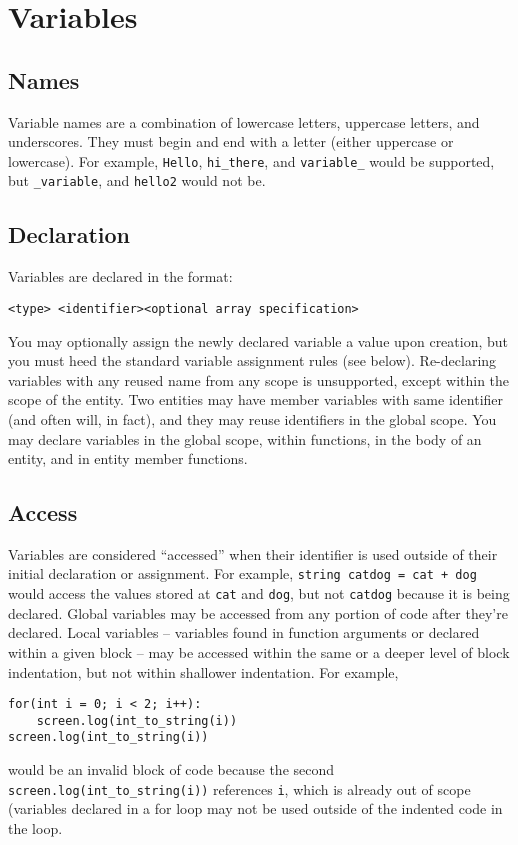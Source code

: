 \documentclass[titlepage]{article}
\begin{document}
\section{Variables}

\subsection{Names}
Variable names are a combination of lowercase letters, uppercase letters, and underscores. They must begin and end with a letter (either uppercase or lowercase). For example, \verb|Hello|, \verb|hi_there|, and \verb|variable_| would be supported, but \verb|_variable|, and \verb|hello2| would not be.

\subsection{Declaration}
Variables are declared in the format:
\begin{verbatim}
<type> <identifier><optional array specification>
\end{verbatim}
You may optionally assign the newly declared variable a value upon creation, but you must heed the standard variable assignment rules (see below). Re-declaring variables with any reused name from any scope is unsupported, except within the scope of the entity. Two entities may have member variables with same identifier (and often will, in fact), and they may reuse identifiers in the global scope.  You may declare variables in the global scope, within functions, in the body of an entity, and in entity member functions.

\subsection{Access}
Variables are considered “accessed” when their identifier is used outside of their initial declaration or assignment. For example, \verb|string catdog = cat + dog| would access the values stored at \verb|cat| and \verb|dog|, but not \verb|catdog| because it is being declared. Global variables may be accessed from any portion of code after they’re declared. Local variables -- variables found in function arguments or declared within a given block -- may be accessed within the same or a deeper level of block indentation, but not within shallower indentation. For example,
\begin{verbatim}
for(int i = 0; i < 2; i++):
    screen.log(int_to_string(i))
screen.log(int_to_string(i))
\end{verbatim}
would be an invalid block of code because the second \verb|screen.log(int_to_string(i))| references \verb|i|, which is already out of scope (variables declared in a for loop may not be used outside of the indented code in the loop. 
\end{document}
